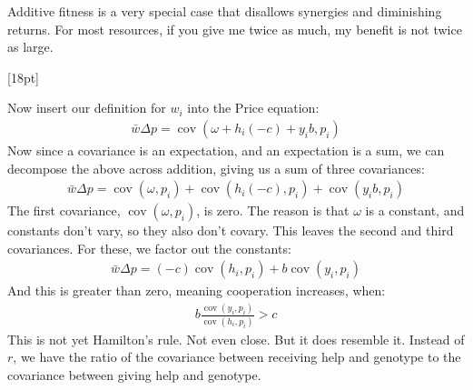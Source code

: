 \documentclass[10pt,reqno]{amsbook}
\DeclareMathOperator{\cov}{cov}
\newcommand{\margincap}[2][10pt]{\marginnote{\small\emph{#2}}[#1]}
\newcounter{myfigure}[chapter]
\newcommand{\figmarlab}[2][18pt]{%
  \refstepcounter{myfigure}%
  \label{#2}%
  \margincap[#1]{Figure\\\thechapter.\themyfigure}%
}
\numberwithin{equation}{chapter}
\begin{document}
Additive fitness is a very special case that disallows synergies and diminishing returns. For most resources, if you give me twice as much, my benefit is not twice as large.

\vspace{-6pt}
\figmarlab{figK1}
\begin{center}
\end{center}

Now insert our definition for $w_i$ into the Price equation:
\begin{align*}
	\bar w \Delta p = \cov( \omega + h_i (-c) + y_i b , p_i )
\end{align*}
Now since a covariance is an expectation, and an expectation is a sum, we can decompose the above across addition, giving us a sum of three covariances:
\begin{align*}
	\bar w \Delta p = \cov( \omega , p_i ) + \cov( h_i (-c) , p_i ) + \cov( y_i b , p_i )
\end{align*}
The first covariance, $\cov( \omega , p_i )$, is zero. The reason is that $\omega$ is a constant, and constants don't vary, so they also don't covary. This leaves the second and third covariances. For these, we factor out the constants:
\begin{align*}
	\bar w \Delta p = (-c)\cov( h_i  , p_i ) + b \cov( y_i , p_i )
\end{align*}
And this is greater than zero, meaning cooperation increases, when:
\begin{align*}
	b \frac{ \cov( y_i , p_i ) }{\cov( h_i  , p_i )}  > c
\end{align*}
This is not yet Hamilton's rule. Not even close. But it does resemble it. Instead of $r$, we have the ratio of the covariance between receiving help and genotype to the covariance between giving help and genotype. 
\end{document}
